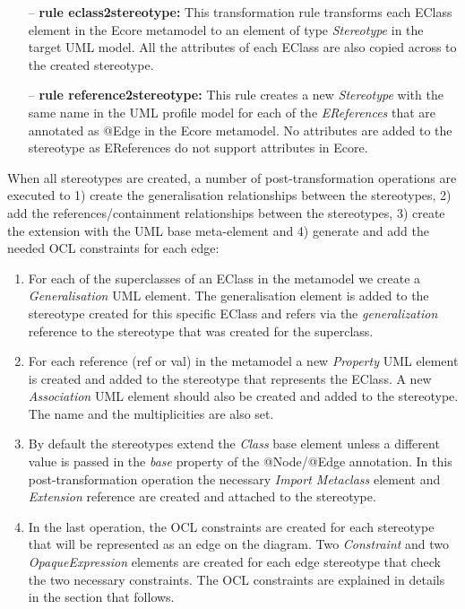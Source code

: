 \begin{itemize}
	\item[--] \textbf{rule eclass2stereotype:} This transformation rule transforms each EClass element in the Ecore metamodel to an element of type \textit{Stereotype} in the target UML model. All the attributes of each EClass are also copied across to the created stereotype.  
	\item[--] \textbf{rule reference2stereotype:} This rule creates a new \textit{Stereotype} with the same name in the UML profile model for each of the \textit{EReferences} that are annotated as @Edge in the Ecore metamodel. No attributes are added to the stereotype as EReferences do not support attributes in Ecore. 
\end{itemize}

When all stereotypes are created, a number of post-transformation operations 
are executed to 1) create the generalisation relationships between the 
stereotypes, 2) add the references/containment relationships between the 
stereotypes, 3) create the extension with the UML base meta-element and 4) 
generate and add the needed OCL constraints for each edge: 

\begin{enumerate}[label=\arabic*)]
	\item For each of the superclasses of an EClass in the metamodel we create a \textit{Generalisation} UML element. The generalisation element is added to the stereotype created for this specific EClass and refers via the \textit{generalization} reference to the stereotype that was created for the superclass.
	\item For each reference (ref or val) in the metamodel a new 
	\textit{Property} UML element is created and added to the stereotype that 
	represents the EClass. A new \textit{Association} UML element should also 
	be created and added to the stereotype. The name and the multiplicities are 
	also set.
	\item By default the stereotypes extend the \textit{Class} base element unless a different value is passed in the \textit{base} property of the @Node/@Edge annotation. In this post-transformation operation the necessary \textit{Import Metaclass} element and \textit{Extension} reference are created and attached to the stereotype.
	\item In the last operation,  the OCL constraints are created for each stereotype that will be represented as an edge on the diagram. Two \textit{Constraint} and two \textit{OpaqueExpression} elements are created for each edge stereotype that check the two necessary constraints. The OCL constraints are explained in details in the section that follows.
\end{enumerate}

